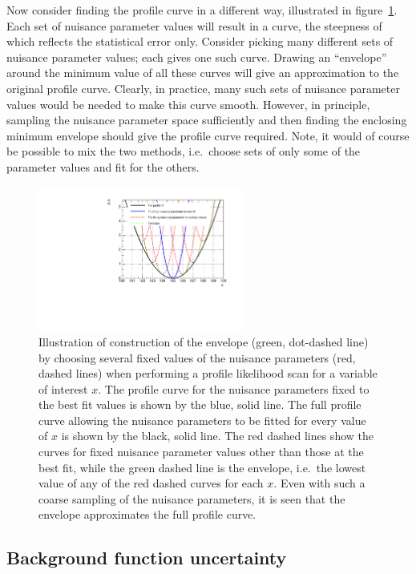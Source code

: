 Now consider finding the profile curve in a different way, illustrated
in figure~\ref{fig:concept:cartoon}.
Each set of nuisance
parameter values will result in a curve, the steepness of which reflects
the statistical error only. Consider picking many different sets of nuisance
parameter values; each gives one such curve. Drawing an ``envelope'' around the
minimum \nll value of all these curves will give an approximation to the
original profile curve. Clearly, in practice, many such sets of nuisance
parameter values would be needed to make this curve smooth. However, in
principle, sampling the nuisance parameter space sufficiently
and then finding the enclosing
minimum envelope should give the profile curve required.
Note, it would of course be possible to mix the two methods, i.e.~choose 
sets of only some of the parameter values and fit for the others.
%
\begin{figure}[tbp]
\centering
\includegraphics[width=0.6\textwidth]{concept/envelope_cartoon.pdf}
\caption{Illustration of construction of the envelope (green, dot-dashed line)
by choosing several fixed values of the nuisance parameters (red, dashed lines)
when performing a profile likelihood scan for a variable of interest $x$.
The \nll profile curve for the nuisance parameters fixed to the best fit
values is shown by the blue, solid line. The full profile curve allowing the
nuisance parameters to be fitted for every value of $x$ is shown by the
black, solid line. The red dashed lines show the \nll curves for fixed
nuisance parameter values other than those at the best fit, while the green
dashed line is the envelope, i.e.~the lowest value of any of the red dashed
curves for each $x$. Even with such a coarse sampling of the nuisance
parameters, it is seen that the envelope approximates the full profile curve.}
\label{fig:concept:cartoon}
\end{figure}

\subsection{Background function uncertainty}
\label{sec:concept:functions}

